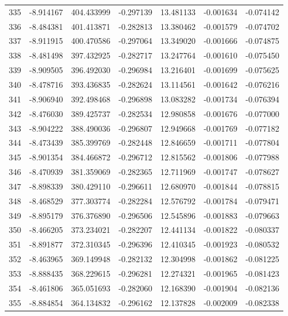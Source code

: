 \begin{tabular}{rrrrrrr}
 335 &  -8.914167 &  404.433999 & -0.297139 &   13.481133 &   -0.001634 & -0.074142 \\
 336 &  -8.484381 &  401.413871 & -0.282813 &   13.380462 &   -0.001579 & -0.074702 \\
 337 &  -8.911915 &  400.470586 & -0.297064 &   13.349020 &   -0.001666 & -0.074875 \\
 338 &  -8.481498 &  397.432925 & -0.282717 &   13.247764 &   -0.001610 & -0.075450 \\
 339 &  -8.909505 &  396.492030 & -0.296984 &   13.216401 &   -0.001699 & -0.075625 \\
 340 &  -8.478716 &  393.436835 & -0.282624 &   13.114561 &   -0.001642 & -0.076216 \\
 341 &  -8.906940 &  392.498468 & -0.296898 &   13.083282 &   -0.001734 & -0.076394 \\
 342 &  -8.476030 &  389.425737 & -0.282534 &   12.980858 &   -0.001676 & -0.077000 \\
 343 &  -8.904222 &  388.490036 & -0.296807 &   12.949668 &   -0.001769 & -0.077182 \\
 344 &  -8.473439 &  385.399769 & -0.282448 &   12.846659 &   -0.001711 & -0.077804 \\
 345 &  -8.901354 &  384.466872 & -0.296712 &   12.815562 &   -0.001806 & -0.077988 \\
 346 &  -8.470939 &  381.359069 & -0.282365 &   12.711969 &   -0.001747 & -0.078627 \\
 347 &  -8.898339 &  380.429110 & -0.296611 &   12.680970 &   -0.001844 & -0.078815 \\
 348 &  -8.468529 &  377.303774 & -0.282284 &   12.576792 &   -0.001784 & -0.079471 \\
 349 &  -8.895179 &  376.376890 & -0.296506 &   12.545896 &   -0.001883 & -0.079663 \\
 350 &  -8.466205 &  373.234021 & -0.282207 &   12.441134 &   -0.001822 & -0.080337 \\
 351 &  -8.891877 &  372.310345 & -0.296396 &   12.410345 &   -0.001923 & -0.080532 \\
 352 &  -8.463965 &  369.149948 & -0.282132 &   12.304998 &   -0.001862 & -0.081225 \\
 353 &  -8.888435 &  368.229615 & -0.296281 &   12.274321 &   -0.001965 & -0.081423 \\
 354 &  -8.461806 &  365.051693 & -0.282060 &   12.168390 &   -0.001904 & -0.082136 \\
 355 &  -8.884854 &  364.134832 & -0.296162 &   12.137828 &   -0.002009 & -0.082338 \\

\end{tabular}
